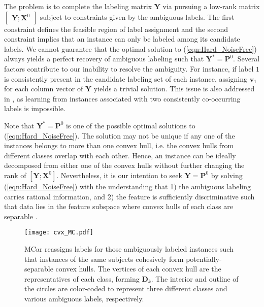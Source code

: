 \documentclass[10pt,journal,compsoc]{IEEEtran}
\begin{document}
The problem is to complete the labeling matrix $\mathbf{Y}$ via pursuing a low-rank matrix $\begin{bmatrix}
\mathbf{Y} ;
\mathbf{X}^0
\end{bmatrix}$ subject to constraints given by the ambiguous labels. The first constraint defines the feasible region of label assignment and the second constraint implies that an instance can only be labeled among its candidate labels.
We cannot guarantee that the optimal solution to (\ref{eqn:Hard_NoiseFree}) always yields a perfect recovery of ambiguous labeling such that $\mathbf{Y}^*= \mathbf{P}^{0}$. Several factors contribute to our inability to resolve the ambiguity. For instance, if label $1$ is consistently present in the candidate labeling set of each instance, assigning $\mathbf{v}_1$ for each column vector of $\mathbf{Y}$ yields a trivial solution. This issue is also addressed in \cite{Cour2011}, as learning from instances associated with two consistently co-occurring labels is impossible.



Note that $\mathbf{Y}^*= \mathbf{P}^{0}$ is one of the possible optimal solutions to (\ref{eqn:Hard_NoiseFree}). The solution may not be unique if any one of the instances belongs to more than one convex hull, i.e. the convex hulls from different classes overlap with each other. Hence, an instance can be ideally decomposed from either one of the convex hulls without further changing the rank of $[\mathbf{Y} ; \mathbf{X}^0]$.
Nevertheless, it is our intention to seek $\mathbf{Y} = \mathbf{P}^0$ by solving (\ref{eqn:Hard_NoiseFree}) with the understanding that 1) the ambiguous labeling carries rational information, and 2) the feature is sufficiently discriminative such that data lies in the feature subspace where convex hulls of each class are separable \cite{Cover1965}.

\begin{figure}
\centering
\texttt{[image: cvx\_MC.pdf]}
\caption{MCar reassigns labels for those ambiguously labeled instances such that instances of the same subjects cohesively form potentially-separable convex hulls.
The vertices of each convex hull are the representatives of each class, forming $\mathbf{D}_k$.
The interior and outline of the circles are color-coded to represent three different classes and various ambiguous labels, respectively.}
\label{fig:convexhull}
\end{figure}
\end{document}
